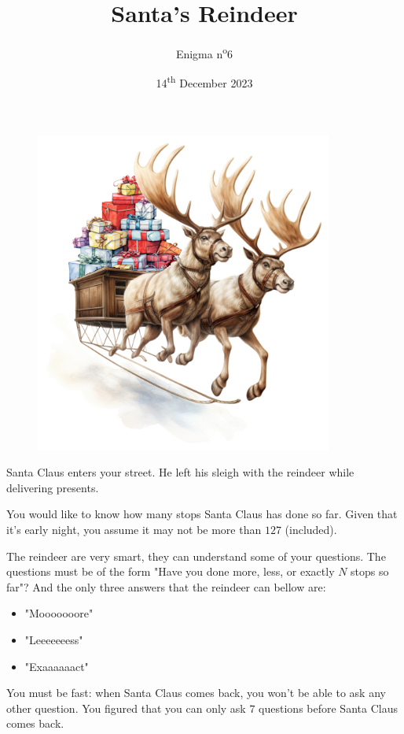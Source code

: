 \documentclass[a4paper, top=10mm]{article}
\title{\textbf{\huge{Santa's Reindeer}}}
\author{Enigma n\textsuperscript{o}6}
\date{14\textsuperscript{th} December 2023}
\begin{document}
	\maketitle
	
	\begin{figure}
		\vspace{-2cm}
		\hspace{-0.5cm}
		\includegraphics[height=300pt]{06sleigh_with_presents.png}
	\end{figure}
	
	Santa Claus enters your street.
	He left his sleigh with the reindeer while delivering presents.
	
	You would like to know how many stops Santa Claus has done so far.
	Given that it's early night, you assume it may not be more than $127$ (included).
	
	The reindeer are very smart, they can understand some of your questions.
	The questions must be of the form "Have you done more, less, or exactly $N$ stops so far"?
	And the only three answers that the reindeer can bellow are:
	\begin{itemize}
		\item "Mooooooore"
		\item "Leeeeeeess"
		\item "Exaaaaaact"
	\end{itemize}
	You must be fast: when Santa Claus comes back, you won't be able to ask any other question.
	You figured that you can only ask $7$ questions before Santa Claus comes back.
	
\end{document}
